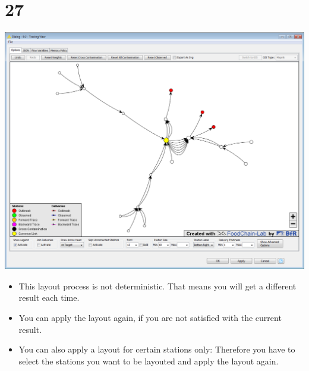 \documentclass[10pt]{beamer}
\begin{document}
\section{27}
\begin{frame}
	\begin{center}
  		\includegraphics[height=0.6\textheight]{27.png}
	\end{center}
	\begin{itemize}
		\item This layout process is not deterministic. That means you will get a different result each time.
		\item You can apply the layout again, if you are not satisfied with the current result.
		\item You can also apply a layout for certain stations only:  Therefore you have to select the stations you want to be layouted and apply the layout again.
	\end{itemize}
\end{frame}
\end{document}
